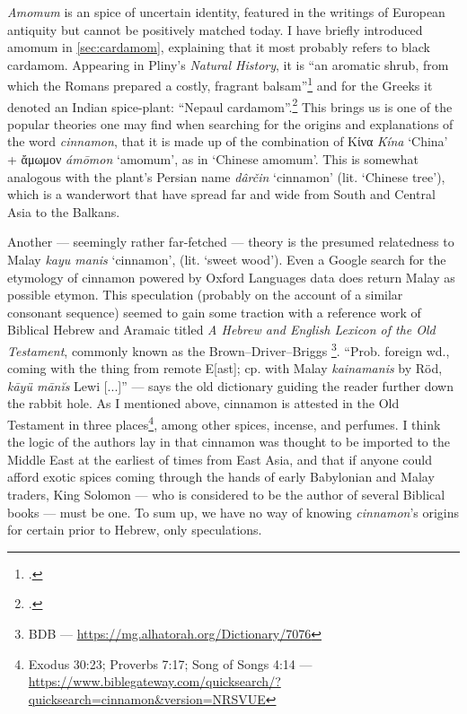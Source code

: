 
\textit{Amomum} is an spice of uncertain identity, featured in the writings of European antiquity but cannot be positively matched today. I have briefly introduced amomum in \cref{sec:cardamom}, explaining that it most probably refers to black cardamom. Appearing in Pliny's \textit{Natural History}, it is ``an aromatic shrub, from which the Romans prepared a costly, fragrant balsam''\footcite[amomum ]{lewis_latin_1879} and for the Greeks it denoted an Indian spice-plant: ``Nepaul cardamom''.\footcite[ἄμωμον ]{liddell_greek-english_1940}
This brings us is one of the popular theories one may find when searching for the origins and explanations of the word \textit{cinnamon}, that it is made up of the combination of Κίνα \textit{Kína} `China' + ἄμωμον \textit{ámōmon} `amomum', as in `Chinese amomum'. This is somewhat analogous with the plant's Persian name \textit{dârčin} `cinnamon' (lit. `Chinese tree'), which is a \gls{wanderwort} that have spread far and wide from South and Central Asia to the Balkans. 

Another --- seemingly rather far-fetched --- theory is the presumed relatedness to Malay \textit{kayu manis} `cinnamon', (lit. `sweet wood'). Even a Google search for the etymology of cinnamon powered by Oxford Languages data does return Malay as possible etymon. This speculation (probably on the account of a similar consonant sequence) seemed to gain some traction with a reference work of Biblical Hebrew and Aramaic titled \textit{A Hebrew and English Lexicon of the Old Testament}, commonly known as the Brown–Driver–Briggs \parencite[see][890]{brown_hebrew_1939}\footnote{BDB --- \url{https://mg.alhatorah.org/Dictionary/7076}}. ``Prob. foreign wd., coming with the thing from remote E[ast]; cp. with Malay \textit{kainamanis} by Röd, \textit{kāyü mānĭs} Lewi [...]'' --- says the old dictionary guiding the reader further down the rabbit hole. As I mentioned above, cinnamon is attested in the Old Testament in three places\footnote{Exodus 30:23; Proverbs 7:17; Song of Songs 4:14 --- \url{https://www.biblegateway.com/quicksearch/?quicksearch=cinnamon&version=NRSVUE}}, among other spices, incense, and perfumes. I think the logic of the authors lay in that cinnamon was thought to be imported to the Middle East at the earliest of times from East Asia, and that if anyone could afford exotic spices coming through the hands of early Babylonian and Malay traders, King Solomon --- who is considered to be the author of several Biblical books --- must be one. To sum up, we have no way of knowing \textit{cinnamon}'s origins for certain prior to Hebrew, only speculations.

